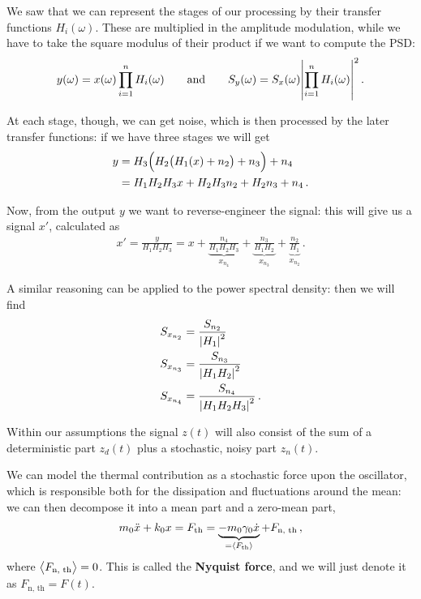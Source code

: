 \documentclass[main.tex]{subfiles}
\begin{document}
We saw that we can represent the stages of our processing by their transfer functions \(H_{i}(\omega )\). These are multiplied in the amplitude modulation, while we have to take the square modulus of their product if we want to compute the PSD: 
%
\begin{align}
y(\omega ) = x(\omega ) \prod_{i=1}^{n} H_i(\omega )
\qquad \text{and} \qquad
S_y(\omega ) = S_x(\omega ) \abs{\prod_{i=1}^{n} H_i(\omega )}^2
\,.
\end{align}
%

At each stage, though, we can get noise,
which is then processed by the later transfer functions: if we have three stages we will get 
%
\begin{align}
y &= H_3 \qty( H_2 \qty( H_1 \qty(x) + n_2) + n_3) + n_4  \\
&= H_1 H_2 H_3 x + H_2 H_3 n_2 + H_2 n_3 + n_4 
\,.
\end{align}

Now, from the output \(y\) we want to reverse-engineer the signal: this will give us a signal \(x'\), calculated as 
%
\begin{align}
x' = \frac{y}{H_1 H_2 H_3 } = 
x + \underbrace{\frac{n_4 }{H_1 H_2 H_3 }}_{x_{n_4}} + \underbrace{\frac{n_3 }{H_1 H_2  }}_{x_{n_3 }}
+ \underbrace{\frac{n_2}{H_1 }}_{x_{n_2 }}
\,.
\end{align}

A similar reasoning can be applied to the power spectral density: then we will find 
%
\begin{align}
S_{x_{n_2}} &= \frac{S_{n_2}}{\abs{H_1}^2} \\
S_{x_{n_3}} &= \frac{S_{n_3}}{\abs{H_1 H_2 }^2} \\
S_{x_{n_4}} &= \frac{S_{n_4}}{\abs{H_1 H_2 H_3 }^2} 
\,.
\end{align}

Within our assumptions the signal \(z(t)\) will also consist of the sum of  a deterministic part \(z_d(t)\) plus a stochastic, noisy part \(z_n(t)\).

We can model the thermal contribution as a stochastic force upon the oscillator, which is responsible both for the dissipation and fluctuations around the mean: we can then decompose it into a mean part and a zero-mean part,
%
\begin{align}
m_0 \ddot{x} + k_0 x = F _{\text{th}} = \underbrace{- m_0 \gamma_0 \dot{x}}_{= \expval{F _{\text{th}}}} + F _{\text{n, th}} 
\,,
\end{align}
%
where \(\expval{F _{\text{n, th}}} = 0\). This is called the \textbf{Nyquist force}, and we will just denote it as \(F _{\text{n, th}} = F(t)\). 
\end{document}
